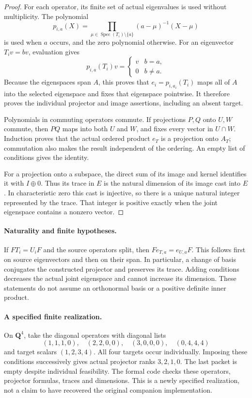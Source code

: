 \documentclass[11pt]{article}
\theoremstyle{definition}
\theoremstyle{remark}
\newcommand{\Q}{\mathbf Q}
\newcommand{\Spec}{\operatorname{Spec}}
\begin{document}
\begin{proof}
For each operator, its finite set of actual eigenvalues is used without
multiplicity. The polynomial
\[
 p_{i,a}(X)=\prod_{\mu\in\Spec(T_i)\setminus\{a\}}
 (a-\mu)^{-1}(X-\mu)
\]
is used when $a$ occurs, and the zero polynomial otherwise. For an eigenvector
$T_i v=bv$, evaluation gives
\[
 p_{i,a}(T_i)v=\begin{cases}v&b=a,\\0&b\ne a.\end{cases}
\]
Because the eigenspaces span $A$, this proves that $e_i=p_{i,a_i}(T_i)$ maps
all of $A$ into the selected eigenspace and fixes that eigenspace pointwise.
It therefore proves the individual projector and image assertions, including
an absent target.

Polynomials in commuting operators commute. If projections $P,Q$ onto
$U,W$ commute, then $PQ$ maps into both $U$ and $W$, and fixes every vector
in $U\cap W$. Induction proves that the actual ordered product $e_T$ is a
projection onto $A_T$; commutation also makes the result independent of the
ordering. An empty list of conditions gives the identity.

For a projection onto a subspace, the direct sum of its image and kernel
identifies it with $I\oplus0$. Thus its trace in $E$ is the natural dimension
of its image cast into $E$. In characteristic zero this cast is injective,
so there is a unique natural integer represented by the trace. That integer
is positive exactly when the joint eigenspace contains a nonzero vector.
\end{proof}

\paragraph{Naturality and finite hypotheses.}
If $F T_i=U_i F$ and the source operators split, then
$F e_{T,a}=e_{U,a}F$. This follows first on source eigenvectors and then on
their span. In particular, a change of basis conjugates the constructed
projector and preserves its trace. Adding conditions decreases the actual
joint eigenspace and cannot increase its dimension. These statements do not
assume an orthonormal basis or a positive definite inner product.

\paragraph{A specified finite realization.}
On $\Q^4$, take the diagonal operators with diagonal lists
\[
(1,1,1,0),\quad(2,2,0,0),\quad(3,0,0,0),\quad(0,4,4,4)
\]
and target scalars $(1,2,3,4)$. All four targets occur individually. Imposing
these conditions successively gives actual projector ranks $3,2,1,0$.
The last packet is empty despite individual feasibility. The formal code
checks these operators, projector formulas, traces and dimensions. This is
a newly specified realization, not a claim to have recovered the original
companion implementation.
\end{document}
